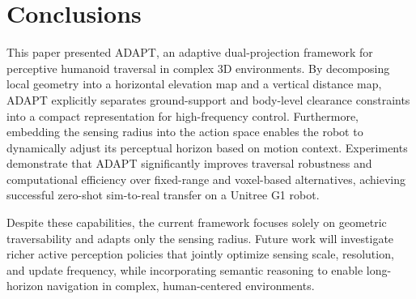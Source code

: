 \documentclass[letterpaper, 10 pt, conference]{ieeeconf/ieeeconf}
\begin{document}
\section{Conclusions}
This paper presented ADAPT, an adaptive dual-projection framework for perceptive humanoid traversal in complex 3D environments. By decomposing local geometry into a horizontal elevation map and a vertical distance map, ADAPT explicitly separates ground-support and body-level clearance constraints into a compact representation for high-frequency control. Furthermore, embedding the sensing radius into the action space enables the robot to dynamically adjust its perceptual horizon based on motion context. Experiments demonstrate that ADAPT significantly improves traversal robustness and computational efficiency over fixed-range and voxel-based alternatives, achieving successful zero-shot sim-to-real transfer on a Unitree G1 robot.

Despite these capabilities, the current framework focuses solely on geometric traversability and adapts only the sensing radius. Future work will investigate richer active perception policies that jointly optimize sensing scale, resolution, and update frequency, while incorporating semantic reasoning to enable long-horizon navigation in complex, human-centered environments.

\balance
\end{document}
